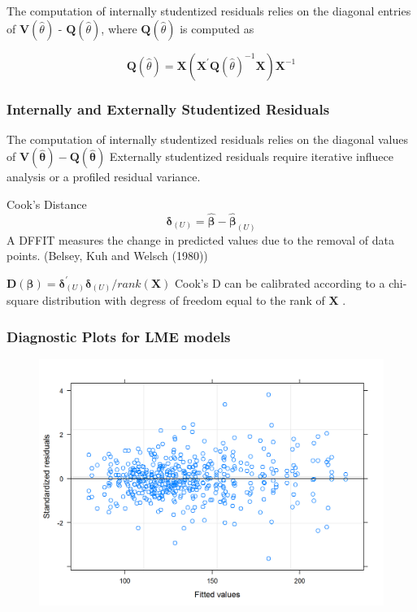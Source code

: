 \documentclass[12pt, a4paper]{report}
\theoremstyle{plain}
\theoremstyle{definition}
\theoremstyle{remark}
\begin{document}
The computation of internally studentized residuals relies on the diagonal entries of $\boldsymbol{V} (\hat{\theta})$ - $\boldsymbol{Q} (\hat{\theta})$, where $\boldsymbol{Q} (\hat{\theta})$ is computed as

\[ \boldsymbol{Q} (\hat{\theta}) = \boldsymbol{X} ( \boldsymbol{X}^{\prime}\boldsymbol{Q} (\hat{\theta})^{-1}\boldsymbol{X})\boldsymbol{X}^{-1} \]









\subsubsection{Internally and Externally Studentized Residuals}
The computation of internally studentized residuals relies on the diagonal values of $\boldsymbol{V(\hat{\theta})} - \boldsymbol{Q(\hat{\theta})}$
Externally studentized residuals require iterative influece analysis or a profiled residual variance.

Cook's Distance
\[ \boldsymbol{\delta}_{(U)} = \boldsymbol{\hat{\beta}}  - \boldsymbol{\hat{\beta}}_{(U)} \]
A DFFIT measures the change in predicted values due to the removal of data points.
(Belsey, Kuh and Welsch (1980))

$\boldsymbol{D(\beta)}  = \boldsymbol{\delta}^{\prime}_{(U)} \boldsymbol{\delta}_{(U)} / rank(\boldsymbol{X})$
Cook's D can be calibrated according to a chi-square distribution with degress of freedom equal to the rank of $\boldsymbol{X}$ \citep{Christensen}.




\subsubsection{Diagnostic Plots for LME models}





\begin{figure}[h!]
	\centering
	\includegraphics[width=0.9\linewidth]{images/ResidPlot1}
	\caption{}
	\label{fig:ResidPlot1}
\end{figure}
\end{document}
